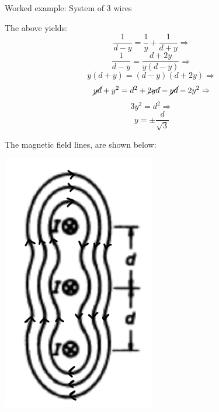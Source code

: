 {\begin{frame}{Worked example: System of 3 wires}
  \begin{minipage}[r]{0.55\textwidth}
    The above yields:
    \begin{equation*}
        \frac{1}{d-y} = \frac{1}{y} + \frac{1}{d+y} \Rightarrow
    \end{equation*}
    \begin{equation*}
        \frac{1}{d-y} = \frac{d+2y}{y(d-y)} \Rightarrow
    \end{equation*}
    \begin{equation*}
        y(d+y) = (d-y)(d+2y) \Rightarrow
    \end{equation*}
    \begin{equation*}
        \cancel{yd} + y^2 = d^2 + \cancel{2yd} - \cancel{yd} - 2y^2 \Rightarrow
    \end{equation*}
    \begin{equation*}
        3y^2 = d^2 \Rightarrow
    \end{equation*}
    \begin{equation*}
        y = \pm \frac{d}{\sqrt{3}}
        \label{eq:p3_yvalues_zeroB}
    \end{equation*}
  \end{minipage}
  \begin{minipage}[l]{0.40\textwidth}
    The magnetic field lines, are shown below:
    \begin{center}
      \includegraphics[width=0.50\textwidth]{./images/problems/lect06_3wires_sol_a_1}
    \end{center}
  \end{minipage}


\end{frame}}
